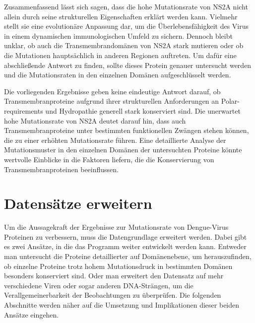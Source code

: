 \documentclass[german,version-2022-01]{uzl-thesis}
\begin{document}
Zusammenfassend l\"asst sich sagen, dass die hohe Mutationsrate von NS2A nicht allein durch seine strukturellen Eigenschaften erkl\"art werden kann. Vielmehr stellt sie eine evolution\"are Anpassung dar, um die \"Uberlebensf\"ahigkeit des Virus in einem dynamischen immunologischen Umfeld zu sichern. Dennoch bleibt unklar, ob auch die Transmembrandom\"anen von NS2A stark mutieren oder ob die Mutationen haupts\"achlich in anderen Regionen auftreten. Um daf\"ur eine abschlie\ss{}ende Antwort zu finden, sollte dieses Protein genauer untersucht werden und die Mutationsraten in den einzelnen Dom\"anen aufgeschl\"usselt werden. 

Die vorliegenden Ergebnisse geben keine eindeutige Antwort darauf, ob Transmembranproteine aufgrund ihrer strukturellen Anforderungen an Polar-requirements und Hydropathie generell stark konserviert sind. Die unerwartet hohe Mutationsrate von NS2A deutet darauf hin, dass auch Transmembranproteine unter bestimmten funktionellen Zw\"angen stehen k\"onnen, die zu einer erh\"ohten Mutationsrate f\"uhren. Eine detaillierte Analyse der Mutationsmuster in den einzelnen Dom\"anen der untersuchten Proteine k\"onnte wertvolle Einblicke in die Faktoren liefern, die die Konservierung von Transmembranproteinen beeinflussen.

\section{Datens\"atze erweitern}
Um die Aussagekraft der Ergebnisse zur Mutationsrate von Dengue-Virus Proteinen zu verbessern, muss die Datengrundlage erweitert werden. Dabei gibt es zwei Ans\"atze, in die das Programm weiter entwickelt werden kann. Entweder man untersucht die Proteine detaillierter auf Dom\"anenebene, um herauszufinden, ob einzelne Proteine trotz hohem Mutationsdruck in bestimmten Dom\"anen besonders konserviert sind. Oder man erweitert den Datensatz auf mehr verschiedene Viren oder sogar anderen DNA-Str\"angen, um die Verallgemeinerbarkeit der Beobachtungen zu \"uberpr\"ufen. Die folgenden Abschnitte werden n\"aher auf die Umsetzung und Implikationen dieser beiden Ans\"atze eingehen.
\end{document}

